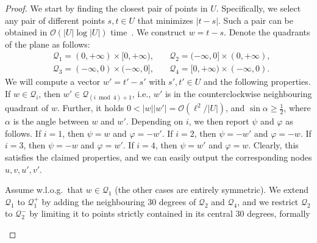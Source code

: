 \documentclass[a4paper,11pt]{article}
\renewcommand{\O}{\mathcal{O}}
\newcommand{\Q}{\mathcal{Q}}
\renewcommand{\phi}{\varphi}
\newcommand{\absolute}[1]{\left\lvert#1\right\rvert}
\begin{document}
\restateThmGetPeriods
\begin{proof}
We start by finding the closest pair of points in $U$.
Specifically, we select any pair of different points $s, t \in U$ that minimizes $\absolute{t - s}$. 
Such a pair can be obtained in $\O(\absolute{U} \log \absolute{U})$ time~\cite{Clarkson1983}.
We construct $w = t - s$.
%
Denote the quadrants of the plane as follows:%
%
\begin{align*}
&\Q_1 = (0,+\infty) \times [0,+\infty), \quad & \Q_2 = (-\infty,0] \times (0,+\infty),\\
&\Q_3 = (-\infty,0) \times (-\infty,0], \quad & \Q_4 = [0,+\infty) \times (-\infty,0).
\end{align*}
%
We will compute a vector $w' = t' - s'$ with $s', t' \in U$ and the following properties. If $w \in \Q_i$, then $w' \in \Q_{(i \bmod 4) + 1}$, i.e., $w'$ is in the counterclockwise neighbouring quadrant of $w$. Further, it holds $0 < \absolute{w}\absolute{w'} = \O(\ell^2 / \absolute{U})$, and $\sin \alpha \ge \frac{1}{2}$, where $\alpha$ is the angle between $w$ and $w'$. Depending on $i$, we then report $\psi$ and $\phi$ as follows. If $i = 1$, then $\psi = w$ and $\phi = -w'$. If $i = 2$, then $\psi = -w'$ and $\phi = -w$. If $i = 3$, then $\psi = -w$ and $\phi = w'$. If $i = 4$, then $\psi = w'$ and $\phi = w$. Clearly, this satisfies the claimed properties, and we can easily output the corresponding nodes $u,v,u',v'$.


Assume w.l.o.g.\ that $w \in \Q_1$ (the other cases are entirely symmetric). 
We extend $\Q_1$ to $\Q_1^+$ by adding the neighbouring $30$ degrees of $\Q_2$ and $\Q_4$, and we restrict $\Q_2$ to $\Q_2^-$ by limiting it to points strictly contained in its central 30 degrees, formally


\begin{center}
\def\fontscaler{.8}
\def\imagescaler{.55}
\let\oldrotatebox\rotatebox
\renewcommand{\rotatebox}[2]{\oldrotatebox{#1}{\scalebox{\fontscaler}{#2}}}
\end{center}
\end{proof}
\end{document}

